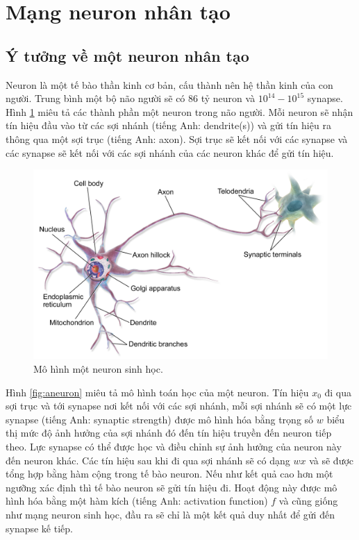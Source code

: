 \section{Mạng neuron nhân tạo}
\subsection{Ý tưởng về một neuron nhân tạo}
Neuron\cite{Suzana:2009} là một tế bào thần kinh cơ bản, cấu thành nên hệ thần kinh của con người. Trung bình một bộ não người sẽ có $86$ tỷ neuron và $10^{14} - 10^{15}$ synapse. Hình \ref{fig:neuron} miêu tả các thành phần một neuron trong não người. Mỗi neuron sẽ nhận tín hiệu đầu vào từ các sợi nhánh (tiếng Anh: dendrite(s)) và gửi tín hiệu ra thông qua một sợi trục (tiếng Anh: axon). Sợi trục sẽ kết nối với các synapse và các synapse sẽ kết nối với các sợi nhánh của các neuron khác để gửi tín hiệu.
\begin{figure}[ht!]
	\centerline{\includegraphics[scale=0.1]{images/neuron.png}}
  	\caption{Mô hình một neuron sinh học.}
  	\label{fig:neuron}
\end{figure}
Hình \ref{fig:aneuron} miêu tả mô hình toán học của một neuron. Tín hiệu $x_0$ đi qua sợi trục và tới synapse nơi kết nối với các sợi nhánh, mỗi sợi nhánh sẽ có một lực synapse (tiếng Anh: synaptic strength) được mô hình hóa bằng trọng số $w$ biểu thị mức độ ảnh hưởng của sợi nhánh đó đến tín hiệu truyền đến neuron tiếp theo. Lực synapse có thể được học và điều chỉnh sự ảnh hưởng của neuron này đến neuron khác. Các tín hiệu sau khi đi qua sợi nhánh sẽ có dạng $wx$ và sẽ được tổng hợp bằng hàm cộng trong tế bào neuron. Nếu như kết quả cao hơn một ngưỡng xác định thì tế bào neuron sẽ gửi tín hiệu đi. Hoạt động này được mô hình hóa bằng một hàm kích (tiếng Anh: activation function) $f$ và cũng giống như mạng neuron sinh học, đầu ra sẽ chỉ là một kết quả duy nhất để gửi đến synapse kế tiếp.
